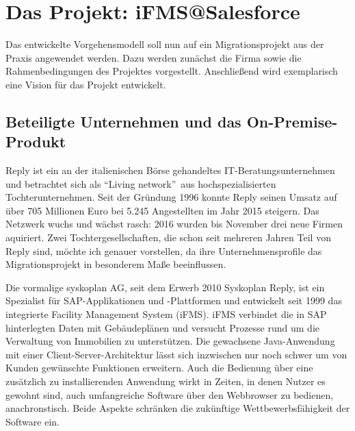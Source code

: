 \section{Das Projekt: iFMS@Salesforce}
\label{cha:result}

Das entwickelte Vorgehensmodell soll nun auf ein Migrationsprojekt aus der 
Praxis angewendet werden. Dazu werden zunächst die Firma sowie die 
Rahmenbedingungen des Projektes vorgestellt. Anschließend wird exemplarisch 
eine Vision für das Projekt entwickelt.

\subsection{Beteiligte Unternehmen und das On-Premise-Produkt}


Reply ist ein an der italienischen Börse gehandeltes 
IT-Beratungsunternehmen und betrachtet sich als "`Living network"'\ aus 
hochspezialisierten Tochterunternehmen. Seit der Gründung 1996 konnte Reply 
seinen Umsatz auf über 705 Millionen Euro bei 5.245 Angestellten im Jahr 2015 
steigern. Das Netzwerk wuchs und wächst rasch: 2016 wurden bis November drei 
neue Firmen aquiriert. Zwei Tochtergesellschaften, die schon seit mehreren 
Jahren Teil von Reply sind, 
möchte ich genauer vorstellen, da ihre Unternehmensprofile das 
Migrationsprojekt in besonderem Maße beeinflussen.

Die vormalige syskoplan AG, seit dem Erwerb 2010  
Syskoplan Reply, ist ein Spezialist für SAP-Applikationen und 
-Plattformen  und entwickelt seit 1999 das 
integrierte Facility Management System (iFMS). iFMS verbindet die in SAP 
hinterlegten Daten mit Gebäudeplänen und versucht Prozesse rund um die 
Verwaltung von Immobilien zu unterstützen. Die gewachsene 
Java-Anwendung mit einer Client-Server-Architektur lässt sich inzwischen nur 
noch schwer um von Kunden gewünschte Funktionen erweitern. Auch die Bedienung 
über 
eine zusätzlich zu installierenden Anwendung wirkt in Zeiten, in denen Nutzer 
es gewohnt sind, auch umfangreiche Software über den Webbrowser zu bedienen, 
anachronstisch. Beide Aspekte schränken die zukünftige
Wettbewerbsfähigkeit der Software ein. 

